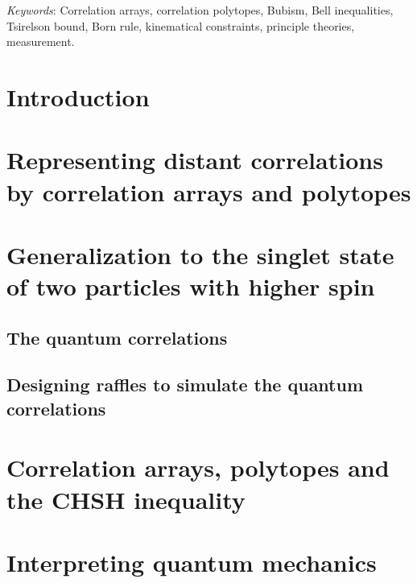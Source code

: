 \documentclass[12pt]{article}
\numberwithin{equation}{section}
\begin{document}
\noindent
\emph{Keywords}: Correlation arrays, correlation polytopes, Bubism, Bell inequalities, Tsirelson bound, Born rule, kinematical constraints, principle theories, measurement.

\tableofcontents

\section{Introduction}\label{0}


\section{Representing distant correlations by correlation arrays and polytopes} \label{1}




\section{Generalization to the singlet state of two particles with higher spin} \label{2}


\subsection{The quantum correlations} \label{2.1}


\subsection{Designing raffles to simulate the quantum correlations} \label{2.2}



\section{Correlation arrays, polytopes and the CHSH inequality} \label{3}


\section{Interpreting quantum mechanics} \label{4}

\end{document}
